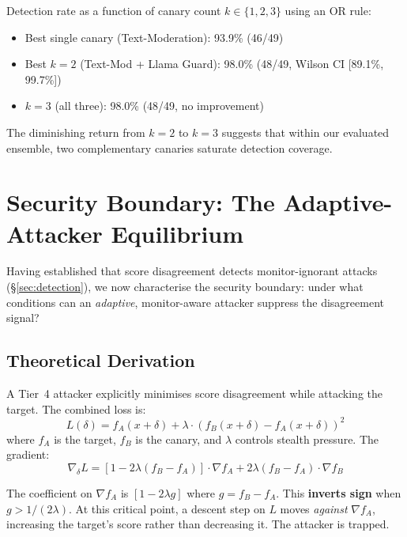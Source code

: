 \documentclass{article}
\begin{document}
Detection rate as a function of canary count $k \in \{1, 2, 3\}$ using an OR rule:
\begin{itemize}
\item Best single canary (Text-Moderation): 93.9\% (46/49)
\item Best $k{=}2$ (Text-Mod + Llama Guard): 98.0\% (48/49, Wilson CI [89.1\%, 99.7\%])
\item $k{=}3$ (all three): 98.0\% (48/49, no improvement)
\end{itemize}

The diminishing return from $k{=}2$ to $k{=}3$ suggests that within our evaluated ensemble, two complementary canaries saturate detection coverage.


\section{Security Boundary: The Adaptive-Attacker Equilibrium}
\label{sec:equilibrium}

Having established that score disagreement detects monitor-ignorant attacks (\S\ref{sec:detection}), we now characterise the security boundary: under what conditions can an \emph{adaptive}, monitor-aware attacker suppress the disagreement signal?

\subsection{Theoretical Derivation}
\label{sec:theory}

A Tier~4 attacker explicitly minimises score disagreement while attacking the target. The combined loss is:
\begin{equation}
\label{eq:div-min-loss}
L(\delta) = f_A(x + \delta) + \lambda \cdot (f_B(x + \delta) - f_A(x + \delta))^2
\end{equation}
where $f_A$ is the target, $f_B$ is the canary, and $\lambda$ controls stealth pressure. The gradient:
\begin{equation}
\nabla_\delta L = [1 - 2\lambda(f_B - f_A)] \cdot \nabla f_A + 2\lambda(f_B - f_A) \cdot \nabla f_B
\end{equation}

The coefficient on $\nabla f_A$ is $[1 - 2\lambda g]$ where $g = f_B - f_A$. This \textbf{inverts sign} when $g > 1/(2\lambda)$. At this critical point, a descent step on $L$ moves \emph{against} $\nabla f_A$, increasing the target's score rather than decreasing it. The attacker is trapped.
\end{document}
